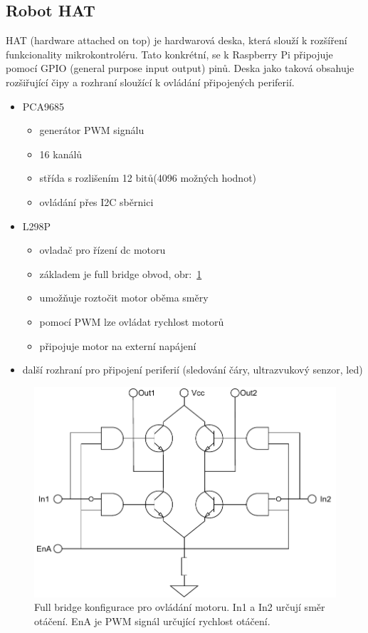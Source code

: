 \subsection*{Robot HAT}
HAT (hardware attached on top) je hardwarová deska, která slouží k rozšíření funkcionality mikrokontroléru. Tato konkrétní, se k Raspberry Pi připojuje pomocí GPIO (general purpose input output) pinů. Deska jako taková obsahuje rozšiřující čipy a rozhraní sloužící k ovládání připojených periferií.

\newpage
\begin{itemize}
	\item{PCA9685 \cite[str:~2]{pca9685}}
	\begin{itemize}
		\item{generátor PWM signálu}
		\item{16 kanálů}
		\item{střída s rozlišením 12 bitů(4096 možných hodnot)}
		\item{ovládání přes I2C sběrnici}
	\end{itemize}
	\item{L298P \cite{l298}}
	\begin{itemize}
		\item{ovladač pro řízení dc motoru}
		\item{základem je full bridge obvod, obr:~\ref{fig:full_bridge}}
		\item{umožňuje roztočit motor oběma směry}
		\item{pomocí PWM lze ovládat rychlost motorů}
		\item{připojuje motor na externí napájení}
	\end{itemize}
	\item{další rozhraní pro připojení periferií (sledování čáry, ultrazvukový senzor, led)}
\end{itemize}

\begin{figure}[h!]
	\centering
	\includegraphics[scale=0.75]{obrazky-figures/motor_full_bridge.pdf}
	\caption[Full bridge zapojení ovladače stejnosměrných motorů]{Full bridge konfigurace pro ovládání motoru. In1 a In2 určují směr otáčení. EnA je PWM signál určující rychlost otáčení. \cite[str:~1]{l298}}
	\label{fig:full_bridge}
\end{figure}

